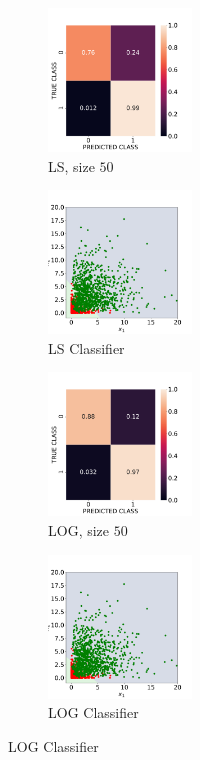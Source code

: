 \documentclass[12pt, a4 paper]{article}
\begin{document}
\begin{figure}[!htbp]
    \begin{subfigure}[!htbp]{0.2\textwidth}
       \centering
       \includegraphics[width=1.5in]{../results/ex1/acc_LS_dataset_Gamma_size_50.pdf}
       \caption{LS, size $50$}
       \label{fig:LS_P1a_50}
    \end{subfigure}
\quad
    \begin{subfigure}[!htbp]{0.2\textwidth}
       \centering
       \includegraphics[width=1.5in]{../results/ex1/samples_LS_dataset_Gamma_size_50.pdf}
       \caption{LS Classifier}
       \label{fig:LSD_P1a_50}
    \end{subfigure}
\quad
    \begin{subfigure}[!htbp]{0.2\textwidth}
       \centering
       \includegraphics[width=1.5in]{../results/ex1/acc_LOG_dataset_Gamma_size_50.pdf}
       \caption{LOG, size $50$}
       \label{fig:LOG_P1a_50}
    \end{subfigure}
\quad
    \begin{subfigure}[!htbp]{0.2\textwidth}
       \centering
       \includegraphics[width=1.5in]{../results/ex1/samples_LOG_dataset_Gamma_size_50.pdf}
       \caption{LOG Classifier}
       \label{fig:LOGD_P1a_50}
    \end{subfigure}
    

\end{figure}
\end{document}
